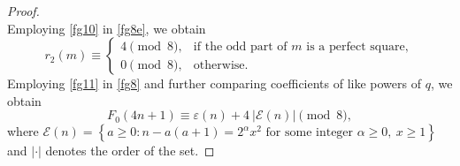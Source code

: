 \documentclass[12pt]{article}
\numberwithin{equation}{section}
\theoremstyle{definition}
\theoremstyle{remark}
\numberwithin{equation}{section}
\begin{document}
\begin{proof}
\begin{equation}
\end{equation}
Employing \eqref{fg10} in \eqref{fg8e}, we obtain 
\begin{equation}\label{fg11}
r_2(m)\equiv
\begin{cases}
4 \pmod 8, & \text{if the odd part of }m\text{ is a perfect square},\\
0 \pmod 8, & \text{otherwise}.
\end{cases}
\end{equation}
Employing \eqref{fg11} in \eqref{fg8} and further comparing coefficients of like powers of $q$, we obtain
\begin{equation}\label{fg12}
F_0(4n+1)
\equiv
\varepsilon(n)+4~|\mathcal{E}(n)|
\pmod 8,
\end{equation}
where
$
\mathcal{E}(n)=
\left\{
a\geq0:
n-a(a+1)=2^\alpha x^2
\text{ for some integer } \alpha\geq0,\ x\geq1
\right\}
$ and $|\cdot|$ denotes the order of the set. 


\end{proof}
\end{document}
